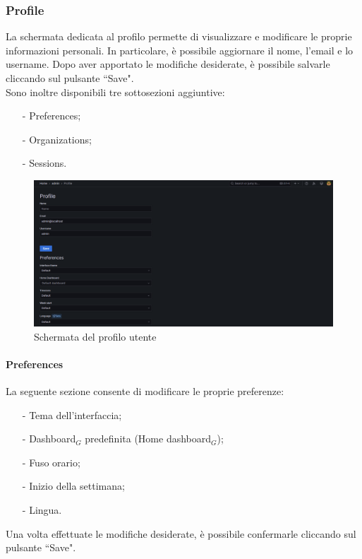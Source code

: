 \documentclass[10pt]{article}
\begin{document}
\begin{justify}
    \subsubsection{Profile}
    La schermata dedicata al profilo permette di visualizzare e modificare le proprie informazioni personali. In particolare, è possibile aggiornare il nome, l'email e lo username. Dopo aver apportato le modifiche desiderate, è possibile salvarle cliccando sul pulsante ``Save".\\
    Sono inoltre disponibili tre sottosezioni aggiuntive:
    \begin{itemize}
        \item[-] Preferences;
        \item[-] Organizations;
        \item[-] Sessions.
    \end{itemize}
    \begin{figure}[H]
    \centering
    \includegraphics[width=1\linewidth]{profile.png}
    \caption{Schermata del profilo utente}
    \end{figure}

    \paragraph{Preferences}
    La seguente sezione consente di modificare le proprie preferenze:  
    \begin{itemize}  
        \item[-] Tema dell'interfaccia;  
        \item[-] Dashboard$_G$ predefinita (Home dashboard$_G$);  
        \item[-] Fuso orario;  
        \item[-] Inizio della settimana;  
        \item[-] Lingua.  
    \end{itemize}  
    Una volta effettuate le modifiche desiderate, è possibile confermarle cliccando sul pulsante ``Save". 
    

\end{justify}
\end{document}
